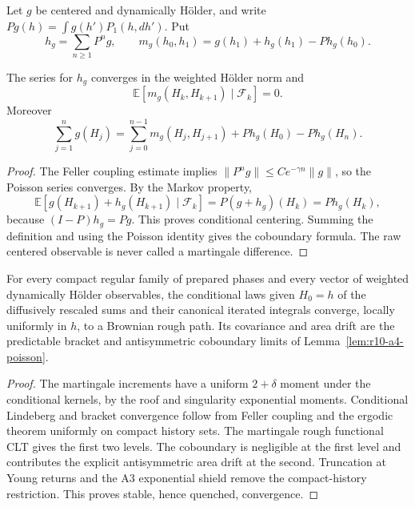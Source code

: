 Let \(g\) be centered and dynamically H\"older, and write
\(Pg(h)=\int g(h')P_1(h,dh')\).  Put
\[
 h_g=\sum_{n\ge1}P^ng,
 \qquad
 m_g(h_0,h_1)=g(h_1)+h_g(h_1)-Ph_g(h_0).
\]

\begin{lemma}
\label{lem:r10-a4-poisson}
The series for \(h_g\) converges in the weighted H\"older norm and
\[
 \mathbb E[m_g(H_k,H_{k+1})\mid\mathcal F_k]=0.
\]
Moreover
\[
 \sum_{j=1}^n g(H_j)
 =\sum_{j=0}^{n-1}m_g(H_j,H_{j+1})
   +Ph_g(H_0)-Ph_g(H_n).
\]
\end{lemma}

\begin{proof}
The Feller coupling estimate implies
\(\|P^ng\|\le Ce^{-\gamma n}\|g\|\), so the Poisson series converges.  By the
Markov property,
\[
 \mathbb E[g(H_{k+1})+h_g(H_{k+1})\mid\mathcal F_k]
 =P(g+h_g)(H_k)=Ph_g(H_k),
\]
because \((I-P)h_g=Pg\).  This proves conditional centering.  Summing the
definition and using the Poisson identity gives the coboundary formula.  The
raw centered observable is never called a martingale difference.
\end{proof}

\begin{theorem}
\label{thm:r10-a4-quenched}
For every compact regular family of prepared phases and every vector of
weighted dynamically H\"older observables, the conditional laws given
\(H_0=h\) of the diffusively rescaled sums and their canonical iterated
integrals converge, locally uniformly in \(h\), to a Brownian rough path.  Its
covariance and area drift are the predictable bracket and antisymmetric
coboundary limits of Lemma~\ref{lem:r10-a4-poisson}.
\end{theorem}

\begin{proof}
The martingale increments have a uniform \(2+\delta\) moment under the
conditional kernels, by the roof and singularity exponential moments.
Conditional Lindeberg and bracket convergence follow from Feller coupling and
the ergodic theorem uniformly on compact history sets.  The martingale rough
functional CLT gives the first two levels.  The coboundary is negligible at
the first level and contributes the explicit antisymmetric area drift at the
second.  Truncation at Young returns and the A3 exponential shield remove the
compact-history restriction.  This proves stable, hence quenched, convergence.
\end{proof}

